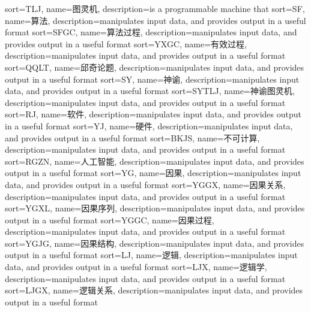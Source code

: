 {
  sort=TLJ,
  name=图灵机,
  description={is a programmable machine that}
}
{
  sort=SF,
  name=算法,
  description={manipulates input data, and provides output in a useful format}
}
{
  sort=SFGC,
  name=算法过程,
  description={manipulates input data, and provides output in a useful format}
}
{
  sort=YXGC,
  name=有效过程,
  description={manipulates input data, and provides output in a useful format}
}
{
  sort=QQLT,
  name=邱奇论题,
  description={manipulates input data, and provides output in a useful format}
}
{
  sort=SY,
  name=神谕,
  description={manipulates input data, and provides output in a useful format}
}
{
  sort=SYTLJ,
  name=神谕图灵机,
  description={manipulates input data, and provides output in a useful format}
}
{
  sort=RJ,
  name=软件,
  description={manipulates input data, and provides output in a useful format}
}
{
  sort=YJ,
  name=硬件,
  description={manipulates input data, and provides output in a useful format}
}
{
  sort=BKJS,
  name=不可计算,
  description={manipulates input data, and provides output in a useful format}
}
{
  sort=RGZN,
  name=人工智能,
  description={manipulates input data, and provides output in a useful format}
}
{
  sort=YG,
  name=因果,
  description={manipulates input data, and provides output in a useful format}
}
{
  sort=YGGX,
  name=因果关系,
  description={manipulates input data, and provides output in a useful format}
}
{
  sort=YGXL,
  name=因果序列,
  description={manipulates input data, and provides output in a useful format}
}
{
  sort=YGGC,
  name=因果过程,
  description={manipulates input data, and provides output in a useful format}
}
{
  sort=YGJG,
  name=因果结构,
  description={manipulates input data, and provides output in a useful format}
}
{
  sort=LJ,
  name=逻辑,
  description={manipulates input data, and provides output in a useful format}
}
{
  sort=LJX,
  name=逻辑学,
  description={manipulates input data, and provides output in a useful format}
}
{
  sort=LJGX,
  name=逻辑关系,
  description={manipulates input data, and provides output in a useful format}
}
